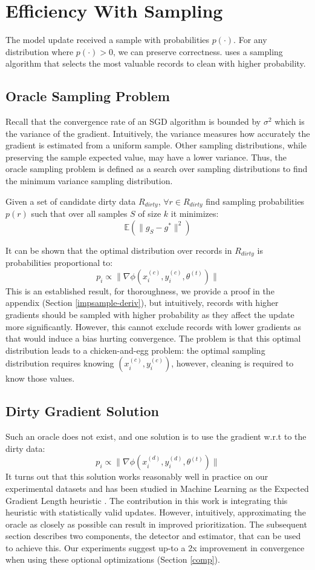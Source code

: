 \section{Efficiency With Sampling}\label{dist-samp}
The model update received a sample with probabilities $p(\cdot)$.
For any distribution where  $p(\cdot) > 0$, we can preserve correctness.
\sys uses a sampling algorithm that selects the most valuable records to clean with higher probability. 

\subsection{Oracle Sampling Problem}
Recall that the convergence rate of an SGD algorithm is bounded by $\sigma^2$ which is the variance of the gradient.
Intuitively, the variance measures how accurately the gradient is estimated from a uniform sample.
Other sampling distributions, while preserving the sample expected value, may have a lower variance.
Thus, the oracle sampling problem is defined as a search over sampling distributions to find the minimum variance sampling distribution.

\begin{definition}
Given a set of candidate dirty data $R_{dirty}$, $\forall r \in R_{dirty}$ find sampling probabilities $p(r)$ such that over all samples $S$ of size $k$ it minimizes:
\[
\mathbb{E}(\|g_S - g^*\|^2)
\]
\end{definition}
It can be shown that the optimal distribution over records in $R_{dirty}$ is probabilities proportional to:
\[
p_i \propto \|\nabla\phi(x^{(c)}_i,y^{(c)}_i,\theta^{(t)})\|
\]
This is an established result, for thoroughness, we provide a proof in the appendix (Section \ref{impsample-deriv}), but intuitively, records with higher gradients should be sampled with higher probability as they affect the update more significantly.
However, this cannot exclude records with lower gradients as that would induce a bias hurting convergence.
The problem is that this optimal distribution leads to a chicken-and-egg problem:
the optimal sampling distribution requires knowing $(x^{(c)}_i,y^{(c)}_i)$, however, cleaning is required to know those values.

\subsection{Dirty Gradient Solution}
Such an oracle does not exist, and one solution is to use the gradient w.r.t to the dirty data:
\[
p_i \propto \|\nabla\phi(x^{(d)}_i,y^{(d)}_i,\theta^{(t)})\|
\]
It turns out that this solution works reasonably well in practice on our experimental datasets and has been studied in Machine Learning as the Expected Gradient Length heuristic \cite{settles2010active}.
The contribution in this work is integrating this heuristic with statistically valid updates.
However, intuitively, approximating the oracle as closely as possible can result in improved prioritization.
The subsequent section describes two components, the detector and estimator, that can be used to achieve this.
Our experiments suggest up-to a 2x improvement in convergence when using these optional optimizations (Section \ref{comp}).
